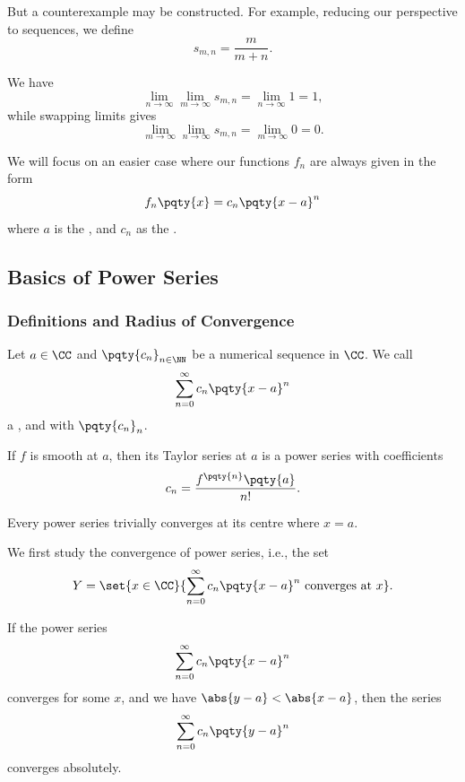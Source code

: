 But a counterexample may be constructed. For example, reducing our perspective to sequences, we define
\[
    s_{m, n} = \frac{m}{m + n}.
\]

We have
\[
    \lim_{n \to \infty} \lim_{m \to \infty} s_{m, n} = \lim_{n \to \infty} 1 = 1,
\]
while swapping limits gives
\[
    \lim_{m \to \infty} \lim_{n \to \infty} s_{m, n} = \lim_{m \to \infty} 0 = 0.
\]

We will focus on an easier case where our functions \(f_n\) are always given in the form
\[
    f_n \pqty{x} = c_n \pqty{x - a}^n
\]
where \(a\) is the , and \(c_n\) as the .

\subsection{Basics of Power Series}

\subsubsection{Definitions and Radius of Convergence}

\begin{definition}
    \label{def:power-series}%
    Let \(a \in \CC\) and \(\pqty{c_n}_{n \in \NN}\) be a numerical sequence in \(\CC\). We call
    \[
        \sum_{n = 0}^{\infty} c_n \pqty{x - a}^n
    \]
    a  , and with  \(\pqty{c_n}_n\).
\end{definition}

\begin{example}
    \label{ex:taylor-series}%
    If \(f\) is smooth at \(a\), then its Taylor series at \(a\) is a power series with coefficients
    \[
        c_n = \frac{f^{\pqty{n}} \pqty{a}}{n!}.
    \]
\end{example}

Every power series trivially converges at its centre where \(x = a\).

We first study the convergence of power series, i.e., the set
\[
    Y = \set{x \in \CC}{\sum_{n = 0}^{\infty} c_n \pqty{x - a}^{n} \text{ converges at }x}.
\]

\begin{lemma}
    \label{lem:convergence-one-point-implies-convergence-smaller-radius}%
    If the power series
    \[
        \sum_{n = 0}^{\infty} c_n \pqty{x - a}^{n}
    \]
    converges for some \(x\), and we have \(\abs{y - a} < \abs{x - a}\), then the series
    \[
        \sum_{n = 0}^{\infty} c_n \pqty{y - a}^{n}
    \]
    converges absolutely.
\end{lemma}

